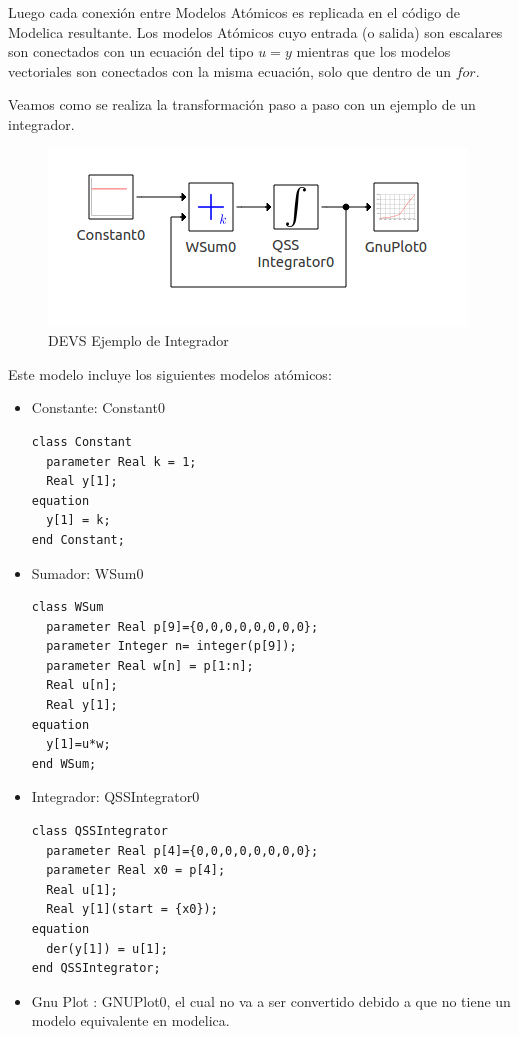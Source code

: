 \documentclass[a4paper,	11pt]{report}
\begin{document}
Luego cada conexión entre Modelos Atómicos es replicada en el código de Modelica resultante. Los modelos Atómicos cuyo entrada (o salida) son escalares son conectados con un ecuación del tipo $u = y$ mientras que los modelos vectoriales son conectados con la misma ecuación, solo que dentro de un $for$.

Veamos como se realiza la transformación paso a paso con un ejemplo de un integrador.

\begin{figure}[!htbp]
\begin{center}
  \includegraphics[scale=0.5]{integrator-devs}
  \caption{DEVS Ejemplo de Integrador}
  \end{center}
   \label{fig:integrator}
\end{figure}

Este modelo incluye los siguientes modelos atómicos:
\begin{itemize}
	\item Constante: Constant0
\begin{verbatim}	
class Constant
  parameter Real k = 1;
  Real y[1];
equation
  y[1] = k;
end Constant;	
\end{verbatim}

	\item Sumador: WSum0
\begin{verbatim}	
class WSum
  parameter Real p[9]={0,0,0,0,0,0,0,0};
  parameter Integer n= integer(p[9]);
  parameter Real w[n] = p[1:n];
  Real u[n];
  Real y[1];
equation
  y[1]=u*w;
end WSum;
\end{verbatim}

	\item Integrador: QSSIntegrator0
\begin{verbatim}	
class QSSIntegrator
  parameter Real p[4]={0,0,0,0,0,0,0,0};
  parameter Real x0 = p[4];
  Real u[1];
  Real y[1](start = {x0});
equation
  der(y[1]) = u[1];
end QSSIntegrator;
\end{verbatim}

	\item Gnu Plot : GNUPlot0, el cual no va a ser convertido debido a que no tiene un modelo equivalente en modelica.
\end{itemize}
\end{document}

